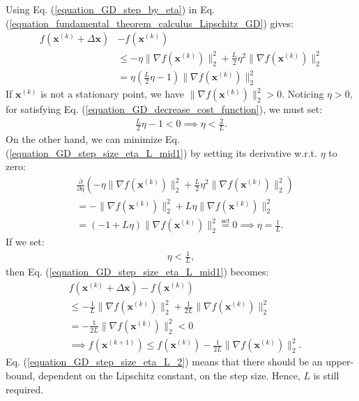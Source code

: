 \documentclass[lang=cn,10pt]{gorgeousnbook}
\numberwithin{equation}{section}%
\numberwithin{figure}{section}%
\begin{document}
Using Eq. (\ref{equation_GD_step_by_eta}) in Eq. (\ref{equation_fundamental_theorem_calculus_Lipschitz_GD}) gives:
\begin{align}
f(\boldsymbol{x}^{(k)} + \Delta \boldsymbol{x}) &- f(\boldsymbol{x}^{(k)}) \nonumber\\
&\leq -\eta \|\nabla f(\boldsymbol{x}^{(k)})\|_2^2 + \frac{L}{2} \eta^2 \|\nabla f(\boldsymbol{x}^{(k)})\|_2^2 \label{equation_GD_step_size_eta_L_mid1}\\
&= \eta (\frac{L}{2} \eta - 1) \|\nabla f(\boldsymbol{x}^{(k)})\|_2^2 \nonumber
\end{align}
If $\boldsymbol{x}^{(k)}$ is not a stationary point, we have $\|\nabla f(\boldsymbol{x}^{(k)})\|_2^2 > 0$. 
Noticing $\eta > 0$, for satisfying Eq. (\ref{equation_GD_decrease_cost_function}), we must set:
\begin{align}\label{equation_GD_step_size_eta_L}
\frac{L}{2} \eta - 1 < 0 \implies \eta < \frac{2}{L}.
\end{align}
On the other hand, we can minimize Eq. (\ref{equation_GD_step_size_eta_L_mid1}) by setting its derivative w.r.t. $\eta$ to zero:
\begin{align*}
&\frac{\partial }{\partial \eta} (-\eta \|\nabla f(\boldsymbol{x}^{(k)})\|_2^2 + \frac{L}{2} \eta^2 \|\nabla f(\boldsymbol{x}^{(k)})\|_2^2) \\
&= -\|\nabla f(\boldsymbol{x}^{(k)})\|_2^2 + L \eta \|\nabla f(\boldsymbol{x}^{(k)})\|_2^2 \\
&= (-1+L \eta) \|\nabla f(\boldsymbol{x}^{(k)})\|_2^2 \overset{\text{set}}{=} 0 \implies \eta = \frac{1}{L}.
\end{align*}
If we set:
\begin{align}\label{equation_GD_step_size_eta_L_2}
\eta < \frac{1}{L},
\end{align}
then Eq. (\ref{equation_GD_step_size_eta_L_mid1}) becomes:
\begin{align}
&f(\boldsymbol{x}^{(k)} + \Delta \boldsymbol{x}) - f(\boldsymbol{x}^{(k)}) \nonumber \\
&\leq -\frac{1}{L} \|\nabla f(\boldsymbol{x}^{(k)})\|_2^2 + \frac{1}{2L} \|\nabla f(\boldsymbol{x}^{(k)})\|_2^2 \nonumber \\
&= -\frac{1}{2L}\|\nabla f(\boldsymbol{x}^{(k)})\|_2^2 < 0 \nonumber \\
&\implies f(\boldsymbol{x}^{(k+1)}) \leq f(\boldsymbol{x}^{(k)}) -\frac{1}{2L}\|\nabla f(\boldsymbol{x}^{(k)})\|_2^2.
\label{equation_GD_decrease_cost}
\end{align}
Eq. (\ref{equation_GD_step_size_eta_L_2}) means that there should be an upper-bound, dependent on the Lipschitz constant, on the step size. Hence, $L$ is still required. 
\end{document}
